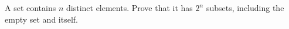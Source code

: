 A set contains $n$ distinct elements. Prove that it has $2^n$ subsets, including the empty set and itself.
